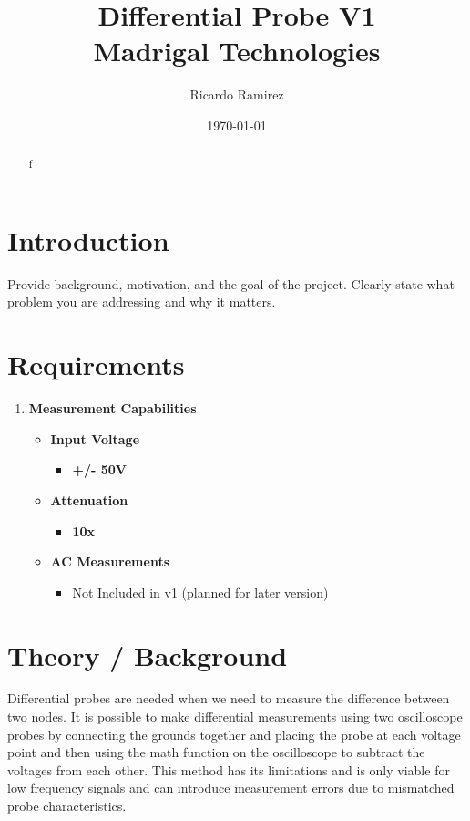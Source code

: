 \documentclass[11pt]{article}
\title{\textbf{Differential Probe V1}\\
\large Madrigal Technologies}
\author{Ricardo Ramirez}
\date{\today}
\begin{document}
\maketitle

\begin{abstract}
\noindent f
\end{abstract}

\section{Introduction}
Provide background, motivation, and the goal of the project. Clearly state what problem you are addressing and why it matters.


\section{Requirements}

\begin{enumerate}
	\item \textbf{Measurement Capabilities} 
	\begin{itemize}
		\item \textbf{Input Voltage} 
			\begin{itemize}
				\item \textbf{+/- 50V}
			\end{itemize}
		\item \textbf{Attenuation}
			\begin{itemize}
				\item \textbf{10x}
			\end{itemize}
		\item \textbf{AC Measurements}
			\begin{itemize}
				\item Not Included in v1 (planned for later version)
			\end{itemize}
	\end{itemize}

\end{enumerate}

\section{Theory / Background}

Differential probes are needed when we need to measure the difference between two nodes. It is possible to make differential measurements using two oscilloscope probes by connecting the grounds together and placing the probe at each voltage point and then using the math function on the oscilloscope to subtract the voltages from each other. This method has its limitations and is only viable for low frequency signals and can introduce measurement errors due to mismatched probe characteristics.
\end{document}
